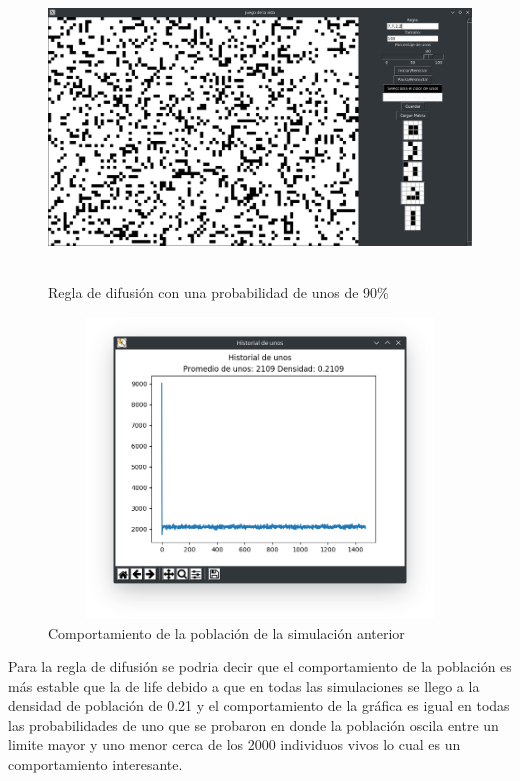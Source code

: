 \begin{figure}[H]
\begin{center}
 \includegraphics[width=12cm, height=8cm]{./img/diffusion80.png}
 \caption{Regla de difusión con una probabilidad de unos de 90\%}
 \label{fig:diffusion90}
\end{center}
\end{figure}

\begin{figure}[H]
\begin{center}
 \includegraphics[width=12cm, height=8cm]{./img/diffusion90grafica.png}
 \caption{Comportamiento de la población de la simulación anterior}
 \label{fig:diffusion90grafica}
\end{center}
\end{figure}

Para la regla de difusión se podria decir que el comportamiento de la población es más estable que la de life debido a que en todas las simulaciones se llego a la densidad de población de 0.21 y el comportamiento de la gráfica es igual en todas las probabilidades de uno que se probaron en donde la población oscila entre un limite mayor y uno menor cerca de los 2000 individuos vivos lo cual es un comportamiento interesante.


